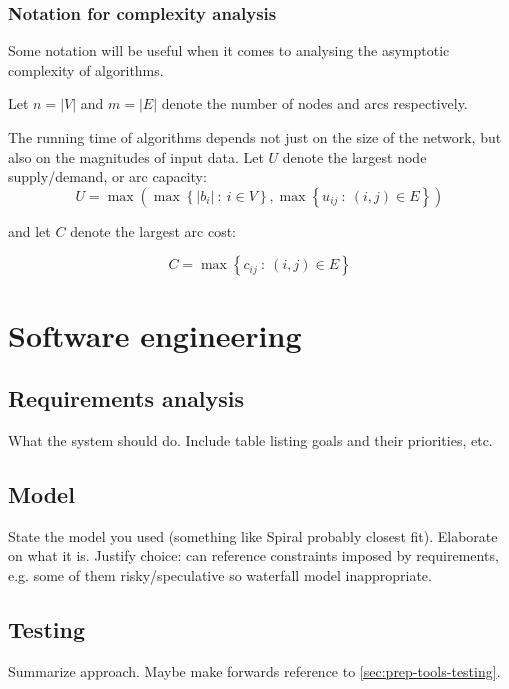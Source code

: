 \subsubsection{Notation for complexity analysis}

Some notation will be useful when it comes to analysing the asymptotic complexity
of algorithms. 

Let $n=|V|$ and $m=|E|$ denote the number of nodes and arcs respectively.

The running time of algorithms depends not just on the size of the
network, but also on the magnitudes of input data. Let $U$ denote
the largest node supply/demand, or arc capacity:
\begin{equation}
U=\max\left(\max\left\{ |b_{i}|\::\: i\in V\right\} ,\max\left\{ u_{ij}\::\:\left(i,j\right)\in E\right\} \right)
\end{equation}

and let $C$ denote the largest arc cost:

\begin{equation}
C=\max\left\{ c_{ij}\::\:(i,j)\in E\right\} 
\end{equation}

\section{Software engineering} \label{sec:prep-sweng}

\subsection{Requirements analysis} \label{sec:prep-sweng-requirements}
What the system should do. Include table listing goals and their priorities, etc.

\subsection{Model}
State the model you used (something like Spiral probably closest fit). Elaborate on what it is. Justify choice: can reference constraints imposed by requirements, e.g. some of them risky/speculative so waterfall model inappropriate.

\subsection{Testing}
Summarize approach. Maybe make forwards reference to \ref{sec:prep-tools-testing}.


